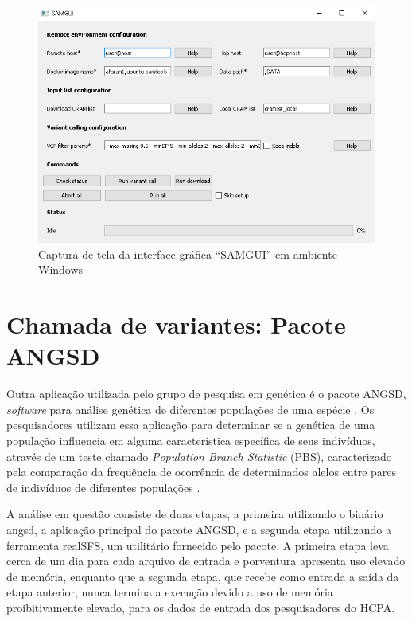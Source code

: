 \documentclass[cic,tc]{iiufrgs}
\begin{document}
\begin{figure}
  \caption{Captura de tela da interface gráfica ``SAMGUI'' em ambiente Windows}
    \begin{center}
      \includegraphics[width=0.85\linewidth]{img/samgui_windows.png}
    \end{center}
    \label{fig:samgui_windows}
\end{figure}

\section{Chamada de variantes: Pacote ANGSD}
\label{sec:angsd}

Outra aplicação utilizada pelo grupo de pesquisa em genética é o pacote ANGSD,
\textit{software} para análise genética de diferentes populações de uma
espécie \cite{korneliussen2014angsd}. Os pesquisadores utilizam essa aplicação
para determinar se a genética de uma população influencia em alguma
característica específica de seus indivíduos, através de um teste chamado
\textit{Population Branch Statistic} (PBS), caracterizado pela comparação da
frequência de ocorrência de determinados alelos entre pares de
indivíduos de diferentes populações \cite{yi2010sequencing}.

A análise em questão consiste de duas etapas, a primeira utilizando o binário
angsd, a aplicação principal do pacote ANGSD, e a segunda etapa utilizando a
ferramenta realSFS, um utilitário fornecido pelo pacote. A primeira etapa leva
cerca de um dia para cada arquivo de entrada e porventura apresenta uso elevado
de memória, enquanto que a segunda etapa, que recebe como entrada a saída da
etapa anterior, nunca termina a execução devido a uso de memória
proibitivamente elevado, para os dados de entrada dos pesquisadores do HCPA.
\end{document}
